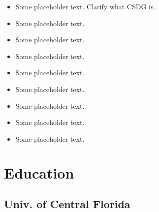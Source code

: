 \documentclass[letterpaper]{resume}
\begin{document}
\begin{minipage}[t]{0.72\textwidth}
\begin{itemize}
\item Some placeholder text. Clarify what CSDG is.
\item Some placeholder text.
\item Some placeholder text.
\end{itemize}

\sectionspace %


\begin{itemize}
\item Some placeholder text.
\item Some placeholder text.
\item Some placeholder text.
\end{itemize}

\sectionspace %


\begin{itemize}
\item Some placeholder text.
\item Some placeholder text.
\item Some placeholder text.
\end{itemize}

\sectionspace %


\section{Education}

\subsection{Univ. of Central Florida}

\sectionspace %


\end{minipage} %
\end{document}
